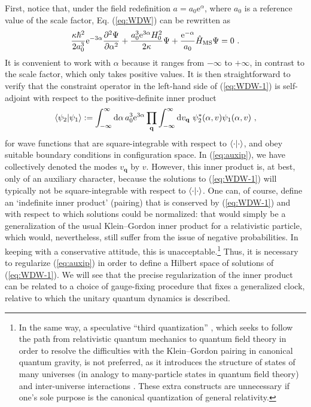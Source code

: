 \documentclass[12pt]{iopart}
\def\eq#1{\begin{equation}\begin{aligned}#1\end{aligned}\end{equation}}
\def\eref#1{(\ref{eq:#1})}
\def\D{\mathrm{d}}
\def\e{\mathrm{e}}
\def\del#1#2{\frac{\partial#1}{\partial#2}}
\def\q{\mathbf{q}}
\begin{document}
First, notice that, under the field redefinition $a = a_0\e^{\alpha}$, where $a_0$ is a reference value of the scale factor, Eq. \eref{WDW} can be rewritten as
\eq{\label{eq:WDW-1}
\frac{\kappa\hbar^2}{2a_0^3}\e^{-3\alpha}\del{^2\Psi}{\alpha^2}+\frac{a_0^3\e^{3\alpha}H_0^2}{2\kappa}\Psi+\frac{\e^{-\alpha}}{a_0}\hat{H}_{\rm MS}\Psi = 0 \ .
}
It is convenient to work with $\alpha$ because it ranges from $-\infty$ to $+\infty$, in contrast to the scale factor, which only takes positive values. It is then straightforward to verify that the constraint operator in the left-hand side of \eref{WDW-1} is self-adjoint with respect to the positive-definite inner product
\eq{\label{eq:auxip}
\braket{\psi_2|\psi_1} := \int_{-\infty}^{\infty}\D\alpha\,a_0^3\e^{3\alpha}\prod_{\q}\int_{-\infty}^{\infty}\D v_{\q}\ \psi_2^*(\alpha,v)\psi_1(\alpha,v) \ , 
}
for wave functions that are square-integrable with respect to $\braket{\cdot|\cdot}$, and obey suitable boundary conditions in configuration space. In \eref{auxip}, we have collectively denoted the modes $v_{\q}$ by $v$. However, this inner product is, at best, only of an auxiliary character, because the solutions to \eref{WDW-1} will typically not be square-integrable with respect to $\braket{\cdot|\cdot}$. One can, of course, define an `indefinite inner product' (pairing) that is conserved by \eref{WDW-1} and with respect to which solutions could be normalized: that would simply be a generalization of the usual Klein--Gordon inner product for a relativistic particle, which would, nevertheless, still suffer from the issue of negative probabilities. In keeping with a conservative attitude, this is unacceptable.\footnote{In the same way, a speculative ``third quantization'' \citep{KucharNoSym,Giddings:1988wv,Coleman:1988tj,McGuigan:1988vi}, which seeks to follow the path from relativistic quantum mechanics to quantum field theory in order to resolve the difficulties with the Klein--Gordon pairing in canonical quantum gravity, is not preferred, as it introduces the structure of  states of many universes (in analogy to many-particle states in quantum field theory) and inter-universe interactions \citep{McGuigan:1988es}. These extra constructs are unnecessary if one's sole purpose is the canonical quantization of general relativity.} Thus, it is necessary to regularize \eref{auxip} in order to define a Hilbert space of solutions of \eref{WDW-1}. We will see that the precise regularization of the inner product can be related to a choice of gauge-fixing procedure that fixes a generalized clock, relative to which the unitary quantum dynamics is described.
\end{document}
